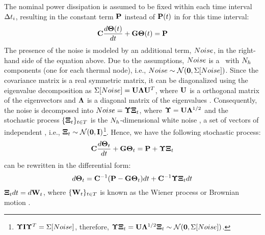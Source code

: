 The nominal power dissipation is assumed to be fixed within each time interval $\Delta t_i$, resulting in the constant term $\mathbf{P}$ instead of $\mathbf{P}(t)$ in  for this time interval:
\begin{equation} \equlabel{fourier-constant-power}
  \mcapacitance \frac{d\vtemperature(\time)}{d\time} + \mconductance \vtemperature(\time) = \vpower
\end{equation}
The presence of the noise is modeled by an additional term, $Noise$, in the right-hand side of the equation above. Due to the assumptions, $Noise$ is a \mnrv\ with $N_h$ components (one for each thermal node), i.e., $Noise \sim \mathcal{N}(\mathbf{0}, \Sigma[Noise])$. Since the covariance matrix is a real symmetric matrix, it can be diagonalized using the eigenvalue decomposition as $\Sigma[Noise] = \mathbf{U} \mathbf{\Lambda} \mathbf{U}^T$, where $\mathbf{U}$ is a orthogonal matrix of the eigenvectors and $\mathbf{\Lambda}$ is a diagonal matrix of the eigenvalues \cite{press2007}. Consequently, the noise is decomposed into $Noise = \mathbf{\Upsilon} \mathbf{\Xi}_t$, where $\mathbf{\Upsilon} = \mathbf{U} \mathbf{\Lambda}^{1/2}$ and the stochastic process $\{ \mathbf{\Xi}_t \}_{t \in T}$ is the $N_h$-dimensional white noise \cite{oksendal2003}, a set of vectors of independent \snrvs, i.e., $\mathbf{\Xi}_t \sim \mathcal{N}(\mathbf{0}, \mathbf{I})$\footnote{$\mathbf{\Upsilon} \mathbf{I} \mathbf{\Upsilon}^T = \Sigma[Noise]$, therefore, $\mathbf{\Upsilon} \mathbf{\Xi}_t = \mathbf{U} \mathbf{\Lambda}^{1/2} \mathbf{\Xi}_t \sim \mathcal{N}(\mathbf{0}, \Sigma[Noise])$.}. Hence, we have the following stochastic process:
\begin{equation} \equlabel{fourier-noise}
  \mcapacitance \frac{d\vtemperature_\time}{d\time} + \mconductance \vtemperature_\time = \vpower + \mnoisedeviation \vstdnormal_\time
\end{equation}
 can be rewritten in the differential form:
\begin{equation} \equlabel{fourier-wiener}
  d\vtemperature_\time = \mcapacitance^{-1}(\vpower - \mconductance \vtemperature_\time)d\time + \mcapacitance^{-1} \mnoisedeviation \vstdnormal_t d\time
\end{equation}
$\mathbf{\Xi}_t dt = d\mathbf{W}_t$, where $\{ \mathbf{W}_t \}_{t \in T}$ is known as the Wiener process or Brownian motion \cite{oksendal2003}.

